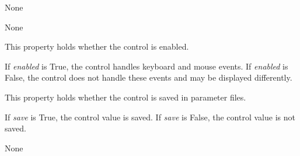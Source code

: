 \documentclass[letterpaper,10pt,english]{sphinxmanual}
\begin{document}
\begin{fulllineitems}
\begin{fulllineitems}
\end{fulllineitems}


\begin{fulllineitems}
\label{api:qwt.PointLinePlot.draw_point}
None

\end{fulllineitems}


\begin{fulllineitems}
\label{api:qwt.PointLinePlot.draw_points}
None

\end{fulllineitems}


\begin{fulllineitems}
\label{api:qwt.PointLinePlot.enabled}
This property holds whether the control is enabled.

If \emph{enabled} is True, the control handles keyboard and mouse events.
If \emph{enabled} is False, the control does not handle these events and may
be displayed differently.

\end{fulllineitems}


\begin{fulllineitems}
\label{api:qwt.PointLinePlot.save}
This property holds whether the control is saved in parameter files.

If \emph{save} is True, the control value is saved.
If \emph{save} is False, the control value is not saved.

\end{fulllineitems}


\begin{fulllineitems}
\label{api:qwt.PointLinePlot.set_plot_properties}
None

\end{fulllineitems}


\end{fulllineitems}
\end{document}
